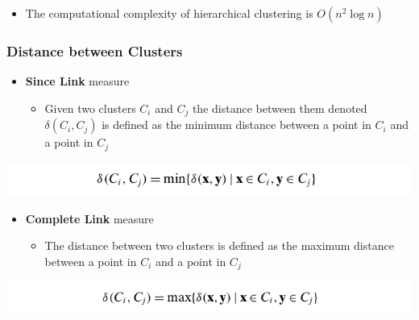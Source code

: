 \documentclass[11pt]{article}
\begin{document}
\begin{itemize}
\item The computational complexity of hierarchical clustering is \(O(n^2\log n)\)
\end{itemize}

\subsubsection{Distance between Clusters}
\label{sec:org0ba9273}
\begin{itemize}
\item \textbf{Since Link} measure
\begin{itemize}
\item Given two clusters \(C_i\) and \(C_j\) the distance between them denoted \(\delta (C_i, C_j)\) is defined as the minimum distance between a point in \(C_i\) and a point in \(C_j\)
\end{itemize}
\end{itemize}
\begin{center}
\includegraphics[width=.9\linewidth]{Hierarchical Clustering/screenshot_2018-12-01_11-38-39.png}
\end{center}

\begin{itemize}
\item \textbf{Complete Link} measure
\begin{itemize}
\item The distance between two clusters is defined as the maximum distance between a point in \(C_i\) and a point in \(C_j\)
\end{itemize}
\end{itemize}
\begin{center}
\includegraphics[width=.9\linewidth]{Hierarchical Clustering/screenshot_2018-12-01_11-39-59.png}
\end{center}
\end{document}

